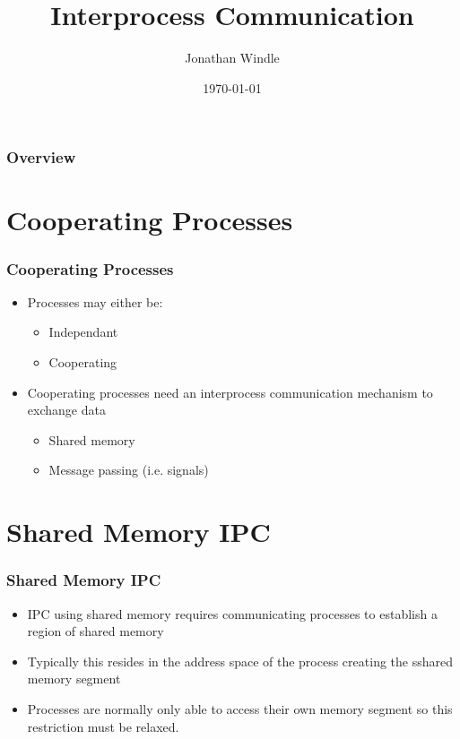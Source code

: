 \documentclass{beamer}
\title[Interprocess Communication]{Interprocess Communication} %
\author{Jonathan Windle} %
\institute[UEA] %
{
University of East Anglia \\ %
\medskip
\textit{J.Windle@uea.ac.uk} %
}
\date{\today} %
\begin{document}
\begin{frame}
\titlepage %
\end{frame}

\begin{frame}[allowframebreaks]
\frametitle{Overview} %
\tableofcontents %
\end{frame}

\section{Cooperating Processes}
\begin{frame}
\frametitle{Cooperating Processes}
\begin{itemize}
\item Processes may either be:
\begin{itemize}
\item Independant
\item Cooperating
\end{itemize}
\item Cooperating processes need an interprocess communication mechanism to exchange data
\begin{itemize}
\item Shared memory
\item Message passing (i.e. signals)
\end{itemize}
\end{itemize}
\end{frame}
\section{Shared Memory IPC}
\begin{frame}
\frametitle{Shared Memory IPC}
\begin{itemize}
\item IPC using shared memory requires communicating processes to establish a region of shared memory
\item Typically this resides in the address space of the process creating the sshared memory segment
\item Processes are normally only able to access their own memory segment so this restriction must be relaxed.
\end{itemize}
\end{frame}
\end{document}
